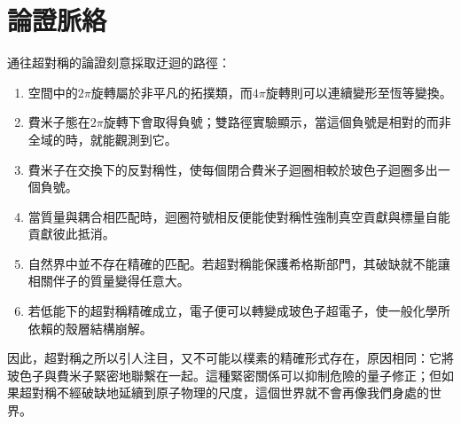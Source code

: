 \section{論證脈絡}

通往超對稱的論證刻意採取迂迴的路徑：
\begin{enumerate}
\item 空間中的\(2\pi\)旋轉屬於非平凡的拓撲類，而\(4\pi\)旋轉則可以連續變形至恆等變換。
\item 費米子態在\(2\pi\)旋轉下會取得負號；雙路徑實驗顯示，當這個負號是相對的而非全域的時，就能觀測到它。
\item 費米子在交換下的反對稱性，使每個閉合費米子迴圈相較於玻色子迴圈多出一個負號。
\item 當質量與耦合相匹配時，迴圈符號相反便能使對稱性強制真空貢獻與標量自能貢獻彼此抵消。
\item 自然界中並不存在精確的匹配。若超對稱能保護希格斯部門，其破缺就不能讓相關伴子的質量變得任意大。
\item 若低能下的超對稱精確成立，電子便可以轉變成玻色子超電子，使一般化學所依賴的殼層結構崩解。
\end{enumerate}

因此，超對稱之所以引人注目，又不可能以樸素的精確形式存在，原因相同：它將玻色子與費米子緊密地聯繫在一起。這種緊密關係可以抑制危險的量子修正；但如果超對稱不經破缺地延續到原子物理的尺度，這個世界就不會再像我們身處的世界。